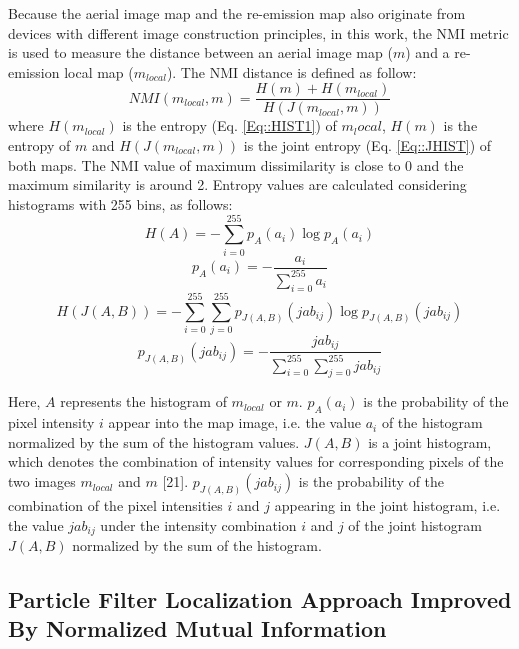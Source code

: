 Because the aerial image map and the re-emission map also originate from devices with different image construction principles, in this work, the NMI metric is used to measure the distance between an aerial image map ($m$) and a re-emission local map ($m_{local}$). The NMI distance is defined as follow:
\begin{equation}
\label{Eq::NMI}
NMI(m_{local},m)= \frac{H(m)+H(m_{local})}{H(J(m_{local},m))}
\end{equation}
where $H(m_{local})$ is the entropy (Eq. \ref{Eq::HIST1}) of $m_local$, $H(m)$ is the entropy of $m$ and $H(J(m_{local},m))$ is the joint entropy (Eq. \ref{Eq::JHIST}) of both maps. The NMI value of maximum dissimilarity is close to 0 and the maximum similarity is around 2. Entropy values are calculated considering histograms with 255 bins, as follows:
\begin{equation}
\label{Eq::HIST1}
H(A)= -\sum\limits_{i=0}^{255}p_A(a_i)\log p_A(a_i)
\end{equation}
\begin{equation}
\label{Eq::PROB1}
p_A(a_i)= -\frac{a_i}{\sum\limits_{i=0}^{255}a_i}
\end{equation}
\begin{equation}
\label{Eq::JHIST}
H(J(A,B))= -\sum\limits_{i=0}^{255}\sum\limits_{j=0}^{255}p_{J(A,B)}(jab_{ij})\log p_{J(A,B)}(jab_{ij})
\end{equation}
\begin{equation}
\label{Eq::PROB2}
p_{J(A,B)}(jab_{ij})= -\frac{jab_{ij}}{\sum\limits_{i=0}^{255}\sum\limits_{j=0}^{255}jab_{ij}}
\end{equation}

Here, $A$ represents the histogram of $m_{local}$ or $m$. $p_A(a_i)$ is the probability of the pixel intensity $i$ appear into the map image, i.e. the value $a_i$ of the histogram normalized by the sum of the histogram values. $J(A,B)$ is a joint histogram, which denotes the combination of intensity values for corresponding pixels of the two images $m_{local}$ and $m$ [21]. $p_{J(A,B)}(jab_{ij})$ is the probability of the combination of the pixel intensities $i$ and $j$ appearing in the joint histogram, i.e. the value $jab_{ij}$ under the intensity combination $i$ and $j$ of the joint histogram $J(A,B)$ normalized by the sum of the histogram.

\subsection{Particle Filter Localization Approach Improved By Normalized Mutual Information}

